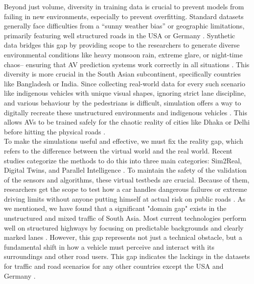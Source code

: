 Beyond just volume, diversity in training data is crucial to prevent models from failing in new environments, especially to prevent overfitting. Standard datasets generally face difficulties from a “sunny weather bias” or geographic limitations, primarily featuring well structured roads in the USA or Germany \cite{Liu2024Survey, Yu2020BDD100K}. Synthetic data bridges this gap by providing scope to the researchers to generate diverse environmental conditions like heavy monsoon rain, extreme glare, or night-time chaos– ensuring that AV prediction systems work correctly in all situations \cite{Yu2020BDD100K, Goel2024SynDiff}. This diversity is more crucial in the South Asian subcontinent, specifically countries like Bangladesh or India. Since collecting real-world data for every such scenario like indigenous vehicles with unique visual shapes, ignoring strict lane discipline, and various behaviour by the pedestrians is difficult, simulation offers a way to digitally recreate these unstructured environments and indigenous vehicles \cite{Ali2025Microscopic}. This allows AVs to be trained safely for the chaotic reality of cities like Dhaka or Delhi before hitting the physical roads \cite{Pachhapurkar2025ARAI, Hossain2025YOLO}.\\

To make the simulations useful and effective, we must fix the reality gap, which refers to the difference between the virtual world and the real world. Recent studies categorize the methods to do this into three main categories: Sim2Real, Digital Twins, and Parallel Intelligence \cite{Hu2023Simulation}. To maintain the safety of the validation of the sensors and algorithms, these virtual testbeds are crucial. Because of them, researchers get the scope to test how a car handles dangerous failures or extreme driving limits without anyone putting himself at actual risk on public roads \cite{Leudet2018Virtual, Pucher2018Performance}. As we mentioned, we have found that a significant "domain gap" exists in the unstructured and mixed traffic of South Asia. Most current technologies perform well on structured highways by focusing on predictable backgrounds and clearly marked lanes \cite{Varma2018IDD}. However, this gap represents not just a technical obstacle, but a fundamental shift in how a vehicle must perceive and interact with its surroundings and other road users. This gap indicates the lackings in the datasets for traffic and road scenarios for any other countries except the USA and Germany \cite{Liu2024Survey, Yu2020BDD100K}.\\

